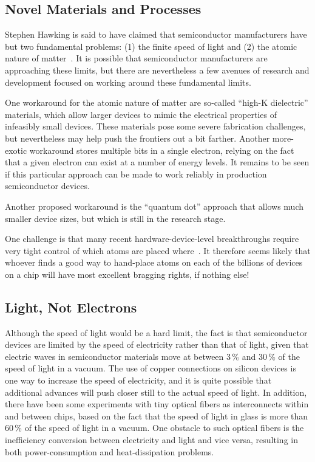 \subsection{Novel Materials and Processes}
\label{sec:cpu:Novel Materials and Processes}

Stephen Hawking is said to have claimed that semiconductor manufacturers
have but two fundamental problems: (1) the finite speed of light and
(2) the atomic nature of matter~\cite{BryanGardiner2007}.
It is possible that semiconductor manufacturers are approaching these
limits, but there are nevertheless a few avenues of research and
development focused on working around these fundamental limits.

One workaround for the atomic nature of matter are so-called
``high-K dielectric'' materials, which allow larger devices to mimic the
electrical properties of infeasibly small devices.
These materials pose some severe fabrication challenges, but nevertheless
may help push the frontiers out a bit farther.
Another more-exotic workaround stores multiple bits in a single electron,
relying on the fact that a given electron can exist at a number of
energy levels.
It remains to be seen if this particular approach can be made to work
reliably in production semiconductor devices.

Another proposed workaround is the ``quantum dot'' approach that
allows much smaller device sizes, but which is still in the research
stage.

One challenge is that many recent hardware-device-level breakthroughs
require very tight control of which atoms are placed
where~\cite{MichaelJKelly2017DeviceLevel}.
It therefore seems likely that whoever finds a good way to hand-place
atoms on each of the billions of devices on a chip will have most
excellent bragging rights, if nothing else!

\subsection{Light, Not Electrons}
\label{sec:cpu:Light; Not Electrons}

Although the speed of light would be a hard limit, the fact is that
semiconductor devices are limited by the speed of electricity rather
than that of light, given that electric waves in semiconductor materials
move at between 3\,\% and 30\,\% of the speed of light in a vacuum.
The use of copper connections on silicon devices is one way to increase
the speed of electricity, and it is quite possible that additional
advances will push closer still to the actual speed of light.
In addition, there have been some experiments with tiny optical fibers
as interconnects within and between chips, based on the fact that
the speed of light in glass is more than 60\,\% of the speed of light
in a vacuum.
One obstacle to such optical fibers is the inefficiency conversion
between electricity and light and vice versa, resulting in both
power-consumption and heat-dissipation problems.


